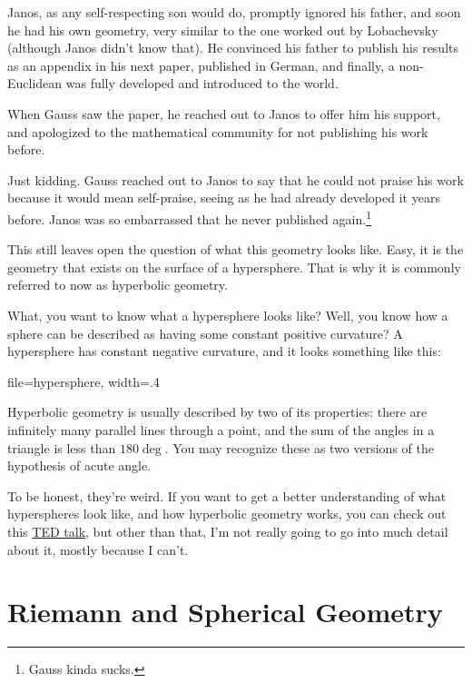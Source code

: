 \documentclass[12pt]{article}
\begin{document}
Janos, as any self-respecting son would do, promptly ignored his father, and soon he had his own geometry, very similar to the one worked out by Lobachevsky (although Janos didn't know that). He convinced his father to publish his results as an appendix in his next paper, published in German, and finally, a non-Euclidean was fully developed and introduced to the world.

When Gauss saw the paper, he reached out to Janos to offer him his support, and apologized to the mathematical community for not publishing his work before.

Just kidding. Gauss reached out to Janos to say that he could not praise his work because it would mean self-praise, seeing as he had already developed it years before. Janos was so embarrassed that he never published again.\footnote{Gauss kinda sucks.}

This still leaves open the question of what this geometry looks like. Easy, it is the geometry that exists on the surface of a hypersphere. That is why it is commonly referred to now as hyperbolic geometry.

What, you want to know what a hypersphere looks like? Well, you know how a sphere can be described as having some constant positive curvature? A hypersphere has constant negative curvature, and it looks something like this:

\begin{fig}{file=hypersphere, width=.4}
\protect\caption*{\small{}}
\end{fig}

Hyperbolic geometry is usually described by two of its properties: there are infinitely many parallel lines through a point, and the sum of the angles in a triangle is less than $180\deg$. You may recognize these as two versions of the hypothesis of acute angle.

To be honest, they're weird. If you want to get a better understanding of what hyperspheres look like, and how hyperbolic geometry works, you can check out this \href{https://www.ted.com/talks/margaret_wertheim_crochets_the_coral_reef}{TED talk}, but other than that, I'm not really going to go into much detail about it, mostly because I can't.

\section*{Riemann and Spherical Geometry}
\end{document}
